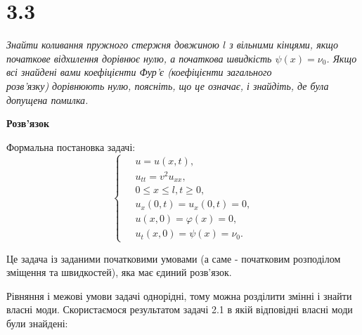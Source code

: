 

%



\section[Задача №3.3]{3.3}

\textit{Знайти коливання пружного стержня довжиною $l$ з вільними кінцями, якщо початкове відхилення дорівнює нулю, а початкова швидкість $\psi(x) = \nu_0$. Якщо всі знайдені вами коефіцієнти Фур'є (коефіцієнти загального\\ розв’язку) дорівнюють нулю, поясніть, що це означає, і знайдіть, де була допущена помилка.}

\begin{center}
    \textbf{Розв'язок}
\end{center}
Формальна постановка задачі:
\begin{equation} \label{probcond5}
    \left\{ \begin{aligned} %
        &\;u = u(x,t), \\
        &\;u_{tt} = v^2 u_{xx}, \\
        &\;0 \leq x \leq l, t \geq 0, \\
        &\;u_x(0,t) = u_x(0,t) = 0,\\
        &\;u(x,0) = \varphi(x) = 0, \\ 
        &\;u_t(x,0) = \psi(x) = \nu_0.
    \end{aligned} \right.
\end{equation}

Це задача із заданими початковими умовами (а саме - початковим розподілом зміщення та швидкостей), яка має єдиний розв'язок.

Рівняння і межові умови задачі однорідні, тому можна розділити змінні і знайти власні моди. Скористаємося результатом задачі 2.1 в якій  відповідні власні моди були знайдені:

